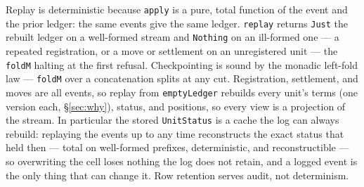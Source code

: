 \documentclass[11pt,a4paper]{article}
\begin{document}
Replay is deterministic because \texttt{apply} is a pure, total function of the
event and the prior ledger: the same events give the same ledger. \texttt{replay}
returns \texttt{Just} the rebuilt ledger on a well-formed stream and \texttt{Nothing}
on an ill-formed one --- a repeated registration, or a move or settlement on an
unregistered unit --- the \texttt{foldM} halting at the first refusal. Checkpointing is
sound by the monadic left-fold law --- \texttt{foldM} over a concatenation splits at
any cut. Registration, settlement, and moves are all events, so replay from
\texttt{emptyLedger} rebuilds every unit's terms (one version each, \S\ref{sec:why}),
status, and positions, so every view is a projection of the stream. In particular the
stored \texttt{UnitStatus} is a cache the log can always rebuild: replaying the events
up to any time reconstructs the exact status that held then --- total on well-formed
prefixes, deterministic, and reconstructible --- so overwriting the cell loses nothing
the log does not retain, and a logged event is the only thing that can change it. Row
retention serves audit, not determinism.
\end{document}
